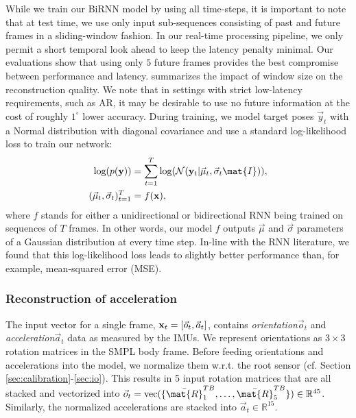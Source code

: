 \documentclass[acmtog]{acmart}
\begin{document}
While we train our BiRNN model by using all time-steps, it is important to note that at test time, we use only input sub-sequences consisting of past and future frames in a sliding-window fashion. In our real-time processing pipeline, we only permit a short temporal look ahead to keep the latency penalty minimal. Our evaluations show that using only \emph{$5$} future frames provides the best compromise between performance and latency.  summarizes the impact of window size on the reconstruction quality. We note that in settings with strict low-latency requirements, such as AR, it may be desirable to use no future information at the cost of roughly $1^\circ$ lower accuracy. %
 During training, we model target poses $\vec{y}_t$ with a Normal distribution with diagonal covariance and use a standard log-likelihood loss to train our network: 
\begin{align}
	\begin{split}
	\text{log} (p(\target)) &= \sum_{t=1}^T \text{log}( \mathcal{N}(\target_t | \vec{\mu}_t, \vec{\sigma}_t\mat{I})), \\
	(\vec{\mu}_t, \vec{\sigma}_t)_{t=1}^{T} &= f(\mathbf{x})   ,
	\label{eq:log_prob_smpl}
	\end{split}
\end{align}
where $f$ stands for either a unidirectional or bidirectional RNN being trained on sequences of $T$ frames. In other words, our model $f$ outputs $\vec{\mu}$ and $\vec{\sigma}$ parameters of a Gaussian distribution at every time step. In-line with the RNN literature, we found that this log-likelihood loss leads to slightly better performance than, for example, mean-squared error (MSE).

\subsubsection{Reconstruction of acceleration}
The input vector for a single frame, $\mathbf{x}_t = [\vec{o}_t, \vec{a}_t]$, contains \textit{orientation}$\vec{o}_t$ and \textit{acceleration}$\vec{a}_t$ data as measured by the IMUs. We represent orientations as $3\times3$ rotation matrices in the SMPL body frame. Before feeding orientations and accelerations into the model, we normalize them w.r.t. the root sensor (cf. Section \ref{sec:calibration}-\ref{sec:io}). This results in 5 input rotation matrices that are all stacked and vectorized into $\vec{o}_t = \text{vec}(\{\bar{\mat{R}}^{TB}_1,\hdots, \bar{\mat{R}}^{TB}_5\}) \in \mathbb{R}^{45}$. Similarly, the normalized accelerations are stacked into $\vec{a}_t \in \mathbb{R}^{15}$. 
\end{document}
